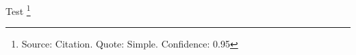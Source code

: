 \documentclass{memoir}
\begin{document}
Test \footnote{Source: Citation. Quote: Simple. Confidence: 0.95}
\end{document}
